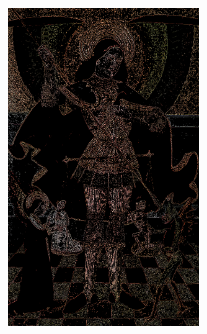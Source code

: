 \begin{figure}[!h]
{        \includegraphics[angle=0,width=0.45\textwidth]{afsnit/afprovning/billeder/thressholds/krafitige_farver/krafite_detalier/1_iteration/300-300.png}
        \label{300-300}}\hspace{1em}
    \\
     \label{allesammen1}
\end{figure}
